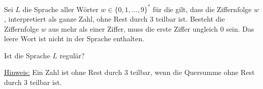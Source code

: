\documentclass{uebungsblatt}
\begin{document}


\begin{aufgabe}
Sei $L$ die Sprache aller Wörter $w \in \{0,1,\ldots,9\}^*$ für die gilt, dass die Ziffernfolge $w$, interpretiert als
ganze Zahl, ohne Rest durch 3 teilbar ist. 
Besteht die Ziffernfolge $w$ aus mehr als einer Ziffer, muss die erste Ziffer ungleich 0 sein.
Das leere Wort ist nicht in der Sprache enthalten. 

\smallskip
Ist die Sprache $L$ regulär?

\smallskip
\underline{Hinweis:}
Ein Zahl ist ohne Rest durch 3 teilbar, wenn die
Quersumme ohne Rest durch 3 teilbar ist.\\

\end{aufgabe}
\begin{loesung} 

\end{loesung}
\newpage
\end{document}
